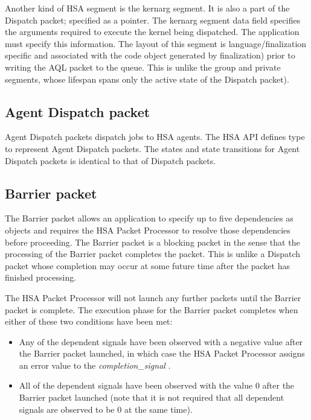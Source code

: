 \documentclass[final]{book}
\newcommand{\reffld}[1]{\textit{#1}}
\newcommand{\mariotodo}[1]{\todo[color=CarnationPink]{#1}}
\begin{document}
Another kind of HSA segment is the kernarg segment. It is also a part of the 
Dispatch packet; specified as a pointer. The kernarg segment data field 
specifies the arguments required to execute the kernel being dispatched. The 
application must specify this information. The layout of this segment is 
language/finalization specific and associated with the code object generated by 
finalization) prior to writing the AQL packet to the queue. This is unlike the 
group and private segments, whose lifespan spans only the active state of the 
Dispatch packet). %

\subsection{Agent Dispatch packet}\label{agent-packet}

Agent Dispatch packets dispatch jobs to HSA agents. The HSA API defines type 
 to represent Agent Dispatch packets. 
The states and state transitions for Agent Dispatch packets is identical to that 
of Dispatch packets.

\subsection{Barrier packet}\label{barrier-packet}

The Barrier packet  allows an application to 
specify up to five dependencies as  objects and 
requires the HSA Packet Processor to resolve those dependencies before proceeding. 
The Barrier packet is a blocking packet in the sense that the processing of the 
Barrier packet completes the packet. This is unlike a Dispatch packet whose 
completion may occur at some future time after the packet has finished 
processing.

The HSA Packet Processor will not launch any further packets until the Barrier 
packet is complete. The execution phase for the Barrier packet completes when 
either of these two conditions have been met:
\begin{itemize}
\item Any of the dependent signals have been observed with a negative value 
  after the Barrier packet launched, in which case the HSA Packet 
  Processor assigns an error value to the \reffld{completion_signal} .
\item All of the dependent signals have been observed with the value 0 after 
  the Barrier packet launched (note that it is not required that all dependent 
  signals are observed to be 0 at the same time).
\end{itemize}
\end{document}
